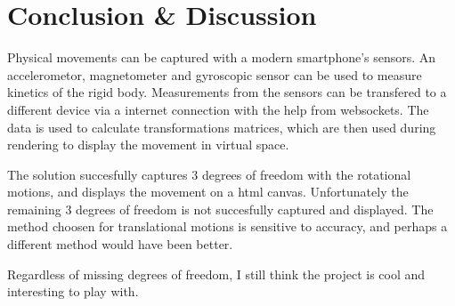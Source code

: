 \section{Conclusion \& Discussion}

Physical movements can be captured with a modern smartphone's sensors.
An accelerometor, magnetometer and gyroscopic sensor can be used to measure kinetics of the rigid body.
Measurements from the sensors can be transfered to a different device via a internet connection with the help from websockets.
The data is used to calculate transformations matrices, which are then used during rendering to display the movement in virtual space.

The solution succesfully captures 3 degrees of freedom with the rotational motions, and displays the movement on a html canvas.
Unfortunately the remaining 3 degrees of freedom is not succesfully captured and displayed.
The method choosen for translational motions is sensitive to accuracy, and perhaps a different method would have been better.

Regardless of missing degrees of freedom, I still think the project is cool and interesting to play with.